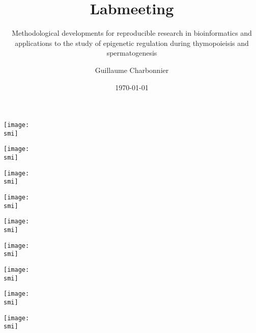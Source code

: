 \documentclass[10pt, notes]{beamer}
\title{Labmeeting}
\subtitle{Methodological developments for reproducible research in bioinformatics and applications to the study of epigenetic regulation during thymopoieisis and spermatogenesis}
\date{\today}
\author{Guillaume Charbonnier}
\institute{TAGC}
\def\smi{out/ln/updir/mw-gcthesis-oral/library.bib}
\begin{document}
\maketitle

\begin{frame}
  \def\smi{out/ln/updir/mw-gcthesis-oral/ink/Ulirsch2019-hsc-lymphoid-myeloid-lineages.pdf}
    \texttt{[image: \\smi]}
\end{frame}
\begin{frame}
  \def\smi{out/ln/updir/mw-gcthesis-oral/ink/Dogan2018-fig1/chromosome-territories.pdf}
    \texttt{[image: \\smi]}
\end{frame}
\begin{frame}
  \def\smi{out/ln/updir/mw-gcthesis-oral/ink/Dogan2018-fig1/ab-compartments.pdf}
    \texttt{[image: \\smi]}
\end{frame}
\begin{frame}
  \def\smi{out/ln/updir/mw-gcthesis-oral/ink/Dogan2018-fig1/tads.pdf}
    \texttt{[image: \\smi]}
\end{frame}
\begin{frame}
  \def\smi{out/ln/updir/mw-gcthesis-oral/ink/Dogan2018-fig1/chromatin-loops.pdf}
    \texttt{[image: \\smi]}
\end{frame}
\begin{frame}
  \def\smi{out/ln/updir/mw-gcthesis-oral/ink/Dogan2018-fig1/nucleosomes.pdf}
    \texttt{[image: \\smi]}
\end{frame}
\begin{frame}
  \def\smi{out/ln/updir/mw-gcthesis-oral/ink/Dogan2018-fig1/custom-layout.pdf}
    \texttt{[image: \\smi]}
\end{frame}
\begin{frame}
  \def\smi{out/ln/updir/mw-gcthesis-oral/ink/Dulac2010-mechanisms-involved-in-chromatin-modifications.pdf}
    \texttt{[image: \\smi]}
\end{frame}
\begin{frame}
  \def\smi{out/ln/updir/mw-gcthesis-oral/ink/Cedar2011/fig2-pluripotency-state.pdf}
    \texttt{[image: \\smi]}
\end{frame}
\end{document}
